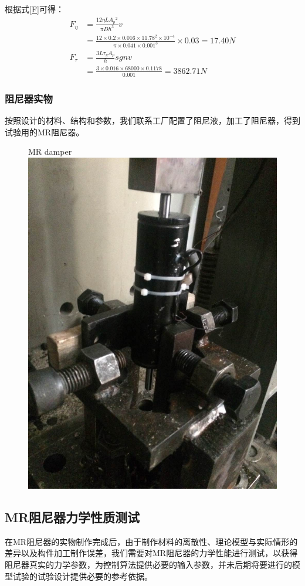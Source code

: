 根据式\eqref{F}可得：
\begin{equation}
\begin{split}
F_\eta&=\frac{12\eta LA{_p}{^2}}{\pi Dh^3}v\\&=\frac{12\times0.2\times0.016\times11.78^2\times10^{-4}}{\pi\times0.041\times0.001^3}\times0.03=17.40N
\\
F_{\tau}&=\frac{3L\tau_yA_p}{h}sgnv\\&=\frac{3\times0.016\times68000\times0.1178}{0.001}=3862.71N
\end{split}
\end{equation}

\subsubsection{阻尼器实物}
按照设计的材料、结构和参数，我们联系工厂配置了阻尼液，加工了阻尼器，得到试验用的MR阻尼器。

\begin{figure}[H]
	\centering
		{MR damper}
	\label{shiwu}
	\includegraphics[width=.5\linewidth]{figure/shiwu}
\end{figure}

\subsection{MR阻尼器力学性质测试}

在MR阻尼器的实物制作完成后，由于制作材料的离散性、理论模型与实际情形的差异以及构件加工制作误差，我们需要对MR阻尼器的力学性能进行测试，以获得阻尼器真实的力学参数，为控制算法提供必要的输入参数，并未后期将要进行的模型试验的试验设计提供必要的参考依据。

